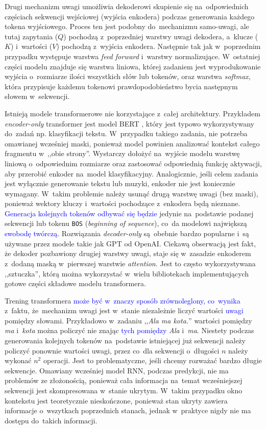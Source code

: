 \documentclass[data-science]{agh-wi} %
\begin{document}
Drugi mechanizm uwagi umożliwia dekoderowi skupienie się na~odpowiednich częściach sekwencji wejściowej (wyjścia enkodera) podczas generowania każdego tokena wyjściowego. Proces ten jest podobny do~mechanizmu samo-uwagi, ale tutaj zapytania ($Q$) pochodzą z~poprzedniej warstwy uwagi dekodera, a~klucze ($K$) i~wartości ($V$) pochodzą z~wyjścia enkodera. Następnie tak jak w~poprzednim przypadku występuje warstwa \textit{feed forward} i~warstwy normalizujące. W~ostatniej części modelu znajduje się warstwa liniowa, której zadaniem jest wyprodukowanie wyjścia o~rozmiarze ilości wszystkich słów lub tokenów, oraz warstwa \textit{softmax}, która przypisuje każdemu tokenowi prawdopodobieństwo bycia następnym słowem w~sekwencji.

Istnieją modele transformerowe nie korzystające z~całej architektury. Przykładem \textit{encoder-only} transformer jest model BERT \cite{bert}, który jest typowo wykorzystywany do~zadań np. klasyfikacji tekstu. W~przypadku takiego zadania, nie potrzeba omawianej wcześniej maski, ponieważ model powinien analizować kontekst całego fragmentu w~,,obie strony''. Wystarczy dołożyć na~wyjście modelu warstwę liniową o~odpowiednim rozmiarze oraz zastosować odpowiednią funkcję aktywacji, aby przerobić enkoder na~model klasyfikacyjny.
Analogicznie, jeśli celem zadania jest wyłącznie generowanie tekstu lub muzyki, enkoder nie jest koniecznie wymagany. W~takim problemie należy usunąć drugą warstwę uwagi (bez maski), ponieważ wektory kluczy i~wartości pochodzące z~enkodera będą nieznane. \textcolor{blue}{Generacja kolejnych tokenów odbywać się będzie} jedynie na~podstawie podanej sekwencji lub tokenu \texttt{BOS} (\textit{beginning of sequence}), co~da modelowi największą \textcolor{blue}{swobodę twórczą}. Rozwiązania \textit{decoder-only} są~obebnie bardzo popularne i~są używane przez modele takie jak GPT od OpenAI. Ciekawą obserwacją jest fakt, że dekoder pozbawiony drugiej warstwy uwagi, staje się w~zasadzie enkoderem z~dodaną maską w~pierwszej warstwie \textit{attention}. Jest to często wykorzystywana ,,sztuczka'', którą można wykorzystać w~wielu bibliotekach implementujących gotowe części składowe modelu transformera.

Trening transformera \textcolor{blue}{może być w~znaczy sposób zrównoleglony, co~wynika} z~faktu, że~mechanizm uwagi jest w~stanie niezależnie liczyć wartości \textcolor{blue}{uwagi} pomiędzy słowami. Przykładowo w~zadaniu ,,\textit{Ala ma kota.}'' wartości pomiędzy \textit{ma} i~\textit{kota} można policzyć nie znając \textcolor{blue}{tych pomiędzy} \textit{Ala} i~\textit{ma}. Niestety podczas generowania kolejnych tokenów na~podstawie istniejącej już sekwencji należy policzyć ponownie wartości uwagi, przez co~dla sekwencji o~długości $n$ należy wykonać $n^2$ operacji. Jest to problematyczne, jeśli chcemy rozważać bardzo długie sekwencje. Omawiany wcześniej model RNN, podczas predykcji, nie ma problemów ze złożonością, ponieważ cała informacja na~temat wcześniejszej sekwencji jest skompresowana w~stanie ukrytym. W~takim przypadku okno kontekstu jest teoretycznie nieskończone, ponieważ stan ukryty zawiera informacje o~wszytkach poprzednich stanach, jednak w~praktyce nigdy nie ma dostępu do~takich informacji.
\end{document}
